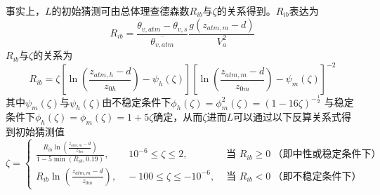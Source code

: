 事实上，$L$的初始猜测可由总体理查德森数$R_{ib}$与$\zeta$的关系得到\citep{arya2001introduction}。$R_{ib}$表达为
\begin{equation}\label{Rib}
R_{i b}=\frac{\theta_{v, atm}-\theta_{v, s}}{\overline{\theta_{v, atm}}} \frac{g\left(z_{atm, m}-d\right)}{V_{a}^{2}}
\end{equation}
$R_{ib}$与$\zeta$的关系为
\begin{equation}
R_{ib}=\zeta\left[\ln{\left(\frac{z_{atm,h}-d}{z_{0h}}\right)-\psi_h(\zeta)}\right] \left[\ln{\left(\frac{z_{atm,m}-d}{z_{0m}}\right)-\psi_m(\zeta)}\right]^{-2}
\end{equation}
其中$\psi_m(\zeta)$与$\psi_h(\zeta)$由不稳定条件下$\phi_h\left(\zeta\right)=\phi_m^2\left(\zeta\right)=\left(1-16\zeta\right)^{-\frac{1}{2}}$ 
与稳定条件下$\phi_h\left(\zeta\right)=\phi_m\left(\zeta\right)=1+5\zeta$确定，从而$\zeta$进而$L$可以通过以下反算关系式得到初始猜测值
\begin{equation}\label{ZetaRib}
  \zeta=\begin{cases}
    \frac{R_{i b} \ln \left(\frac{z_{atm, m}-d}{z_{0 m}}\right)}{1-5 \min \left(R_{i b}, 0.19\right)}, \qquad 10^{-6} \leq \zeta \leq 2, & \text{ 当 } R_{i b} \geq 0\ \text{（即中性或稳定条件下）} \\
    R_{ib} \ln \left(\frac{z_{atm, m}-d}{z_{0 m}}\right),  \quad -100 \leq \zeta \leq-10^{-6}, & \text{ 当 } R_{i b}<0\ \text{（即不稳定条件下）}
  \end{cases}
\end{equation}

